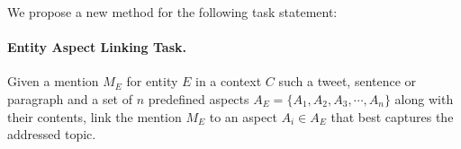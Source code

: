 


\noindent We propose a new method for the following task statement:
\paragraph{\textbf{Entity Aspect Linking Task.}} Given a mention $M_E$ for entity $E$ in a context $C$ such a tweet, sentence or paragraph and a set of $n$ predefined aspects $A_{E} = \{A_1, A_2, A_3, \cdots, A_n\}$ along with their contents, link the mention $M_E$ to an aspect $A_i \in A_{E}$ that best captures the addressed topic. 


